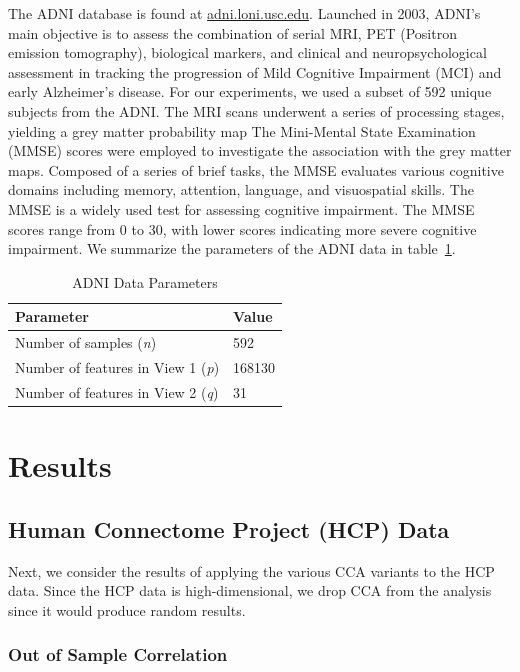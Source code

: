 The ADNI database is found at \url{adni.loni.usc.edu}.
Launched in 2003, ADNI's main objective is to assess the combination of serial MRI, PET (Positron emission tomography), biological markers, and clinical and neuropsychological assessment in tracking the progression of Mild Cognitive Impairment (MCI) and early Alzheimer’s disease.
For our experiments, we used a subset of 592 unique subjects from the ADNI. The MRI scans underwent a series of processing stages, yielding a grey matter probability map
The Mini-Mental State Examination (MMSE) scores were employed to investigate the association with the grey matter maps.
Composed of a series of brief tasks, the MMSE evaluates various cognitive domains including memory, attention, language, and visuospatial skills.
The MMSE is a widely used test for assessing cognitive impairment.
The MMSE scores range from 0 to 30, with lower scores indicating more severe cognitive impairment.
We summarize the parameters of the ADNI data in table~\ref{tab:adni-parameters}.

\begin{table}
\centering
\caption{ADNI Data Parameters}
\begin{tabular}{| l | l |}
\hline
\textbf{Parameter} & \textbf{Value} \\
\hline
Number of samples (\textit{n}) & 592 \\
Number of features in View 1 (\textit{p}) & 168130 \\
Number of features in View 2 (\textit{q}) & 31 \\
\hline
\end{tabular}\label{tab:adni-parameters}
\end{table}

\newpage
\section{Results}

\subsection{Human Connectome Project (HCP) Data}

Next, we consider the results of applying the various CCA variants to the HCP data.
Since the HCP data is high-dimensional, we drop CCA from the analysis since it would produce random results.

\subsubsection{Out of Sample Correlation}


